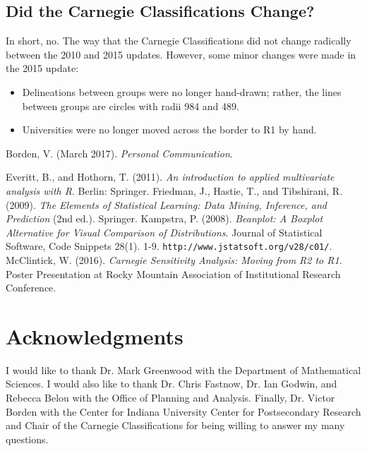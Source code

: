 \documentclass[a0,portrait]{a0poster}
\begin{document}
\begin{multicols}{2}
\subsection*{Did the Carnegie Classifications Change?}
In short, no. The way that the Carnegie Classifications did not change radically between the 2010 and 2015 updates. However, some minor changes were made in the 2015 update: 
\begin{itemize}
	\item Delineations between groups were no longer hand-drawn; rather, the lines between groups are circles with radii 984 and 489. 
	\item Universities were no longer moved across the border to R1 by hand. 
\end{itemize}


\color{DarkSlateGray}


\begin{thebibliography}{9}
Borden, V. (March 2017). \textit{Personal Communication}.


Everitt, B., and Hothorn, T. (2011). \textit{An introduction to applied multivariate analysis with R}. Berlin: Springer.
Friedman, J., Hastie, T., and Tibshirani, R. (2009). \textit{The Elements of Statistical Learning: Data Mining, Inference, and Prediction} (2nd ed.). Springer.
Kampstra, P. (2008). \textit{Beanplot: A Boxplot Alternative for Visual Comparison of Distributions}. Journal of
Statistical Software, Code Snippets 28(1). 1-9. \texttt{http://www.jstatsoft.org/v28/c01/}.
McClintick, W. (2016). \textit{Carnegie Sensitivity Analysis: Moving from R2 to R1}. Poster Presentation at Rocky Mountain Association of Institutional Research Conference.

\end{thebibliography}





\section*{Acknowledgments}

I would like to thank Dr. Mark Greenwood with the Department of Mathematical Sciences. I would also like to thank Dr. Chris Fastnow, Dr. Ian Godwin, and Rebecca Belou with the Office of Planning and Analysis. Finally, Dr. Victor Borden with the Center for Indiana University Center for Postsecondary Research and Chair of the Carnegie Classifications for being willing to answer my many questions. 


\end{multicols}
\end{document}
